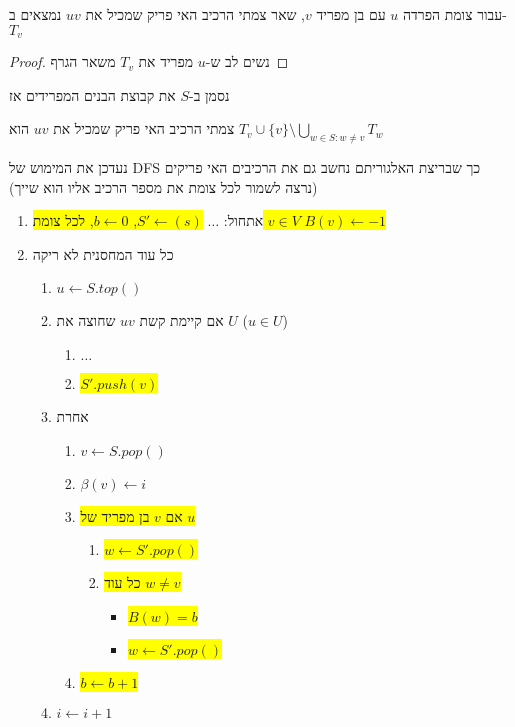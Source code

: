 \begin{claim}
עבור צומת הפרדה $u$ עם בן מפריד $v$, שאר צמתי הרכיב האי פריק שמכיל את $uv$ נמצאים ב-%
$T_v$
\end{claim}
\begin{proof}
נשים לב ש-$u$ מפריד את 
$T_v$
משאר הגרף
\end{proof}
נסמן ב-$S$ את קבוצת הבנים המפרידים אז
\begin{corollary}
צמתי הרכיב האי פריק שמכיל את $uv$ הוא 
$T_v \cup \{v\} \setminus \bigcup_{w \in S:w \ne v} T_w$
\end{corollary}


נעדכן את המימוש של DFS כך שבריצת האלגוריתם נחשב גם את הרכיבים האי פריקים 
(נרצה לשמור לכל צומת את מספר הרכיב אליו הוא שייך)
\begin{enumerate}
\item
אתחול:
$\ldots$
\colorbox{yellow}{
$S' \leftarrow (s)$,
$b \leftarrow 0$,
לכל צומת 
$v \in V$
$B(v) \leftarrow -1$
}
\item
כל עוד המחסנית לא ריקה
\begin{enumerate}
	\item
	$u \leftarrow S.top()$
	\item 
	אם קיימת קשת 
	$uv$
	שחוצה את $U$ 
	($u \in U$)
		\begin{enumerate}
		\item $\ldots$
		\item
		\colorbox{yellow}{$S'.push(v)$}
		\end{enumerate}
	\item
	אחרת 
	\begin{enumerate}
		\item $v \leftarrow S.pop()$
		\item $\beta(v) \leftarrow i$

		\item 
				\colorbox{yellow}{
אם $v$ בן מפריד של $u$
		}
			\begin{enumerate}
				\item \colorbox{yellow}{$w \leftarrow S'.pop()$}
				\item \colorbox{yellow}{
כל עוד 
				$w \ne v$
				}
					\begin{itemize}
						\item \colorbox{yellow}{$B(w) = b$}
						\item \colorbox{yellow}{$w \leftarrow S'.pop()$}
					\end{itemize}	
			\end{enumerate}			
			\item \colorbox{yellow}{$b \leftarrow b + 1$}
	\end{enumerate}
	\item
	$i \leftarrow i + 1$
	\end{enumerate}
\end{enumerate}

